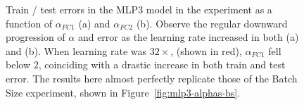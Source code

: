 \begin{figure}[t]
    \centering

    \caption{
            Train / test errors in the MLP3 model in the {\bf \emph{\LearningRate}} experiment as a function of $\alpha_{FC1}$ (a) and $\alpha_{FC2}$ (b). 
            Observe the regular downward progression of $\alpha$ and error as the learning 
            rate increased in both (a) and (b). When learning rate was $32\times$, (shown in red), $\alpha_{FC1}$ fell 
            below $2$, coinciding with a drastic increase in both train and test error. The results here almost 
            perfectly replicate those of the Batch Size experiment, shown in Figure~\ref{fig:mlp3-alphas-bs}.
    }
 \label{fig:mlp3-alphas-lr}
\end{figure}

